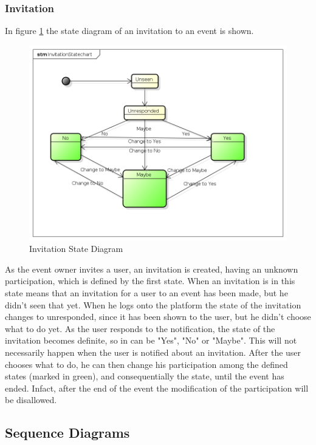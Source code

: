 \subsubsection{Invitation}\label{sssec:invitationstate} 
In figure \ref{fig:invstatediagram} the state diagram of an invitation to an event is shown.
 \begin{center}
 \begin{figure}[H]
    \includegraphics[width=1\textwidth ]{./UMLDiagram/InvitationStatechart/InvitationStatechart.png}
    \caption{Invitation State Diagram}
     \label{fig:invstatediagram}
     \end{figure}
   \end{center}
As the event owner invites a user, an invitation is created, having an unknown participation, which is defined by the first state. When an invitation is in this state means that an invitation for a user to an event has been made, but he didn't seen that yet. When he logs onto the platform the state of the invitation changes to unresponded, since it has been shown to the user, but he didn't choose what to do yet. As the user responds to the notification, the state of the invitation becomes definite, so in can be "Yes", "No" or "Maybe". This will not necessarily happen when the user is notified about an invitation. After the user chooses what to do, he can then change his participation among the defined states (marked in green), and consequentially the state, until the event has ended. Infact, after the end of the event the modification of the participation will be disallowed.
 \subsection{Sequence Diagrams}
